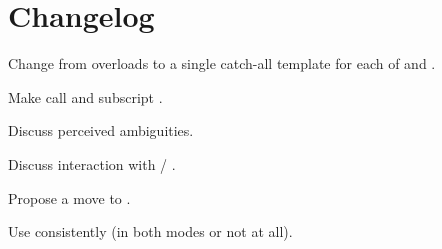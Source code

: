\section{Changelog}
\begin{revision}
\item Change from overloads to a single catch-all template for each of
   and .

\item Make call and subscript .

\item Discuss perceived ambiguities.

\item Discuss interaction with  / .

\item Propose a move to .
\end{revision}

\begin{revision}
\item Use  consistently (in both modes or not at all).
\end{revision}
